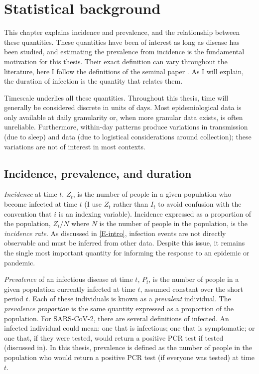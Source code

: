 \documentclass[thesis.tex]{subfiles}
\begin{document}
\chapter{Statistical background} \label{incidence-prevalence}

This chapter explains incidence and prevalence, and the relationship between these quantities.
These quantities have been of interest as long as disease has been studied, and estimating the prevalence from incidence is the fundamental motivation for this thesis.
Their exact definition can vary throughout the literature, here I follow the definitions of the seminal paper \textcite{freemanPrevalence}.
As I will explain, the duration of infection is the quantity that relates them.

Timescale underlies all these quantities.
Throughout this thesis, time will generally be considered discrete in units of days.
Most epidemiological data is only available at daily granularity or, when more granular data exists, is often unreliable.
Furthermore, within-day patterns produce variations in transmission (\eg due to sleep) and data (\eg due to logistical considerations around collection); these variations are not of interest in most contexts.

\section{Incidence, prevalence, and duration}

\emph{Incidence} at time $t$, $Z_t$, is the number of people in a given population who become infected at time $t$ (I use $Z_t$ rather than $I_t$ to avoid confusion with the convention that $i$ is an indexing variable).
Incidence expressed as a proportion of the population, $Z_t/N$ where $N$ is the number of people in the population, is the \emph{incidence rate}.
As discussed in \cref{E-intro}, infection events are not directly observable and must be inferred from other data.
Despite this issue, it remains the single most important quantity for informing the response to an epidemic or pandemic.

\emph{Prevalence} of an infectious disease at time $t$, $P_t$, is the number of people in a given population currently infected at time $t$, assumed constant over the short period $t$.
Each of these individuals is known as a \emph{prevalent} individual.
The \emph{prevalence proportion} is the same quantity expressed as a proportion of the population.
For SARS-CoV-2, there are several definitions of infected.
An infected individual could mean: one that is infectious; one that is symptomatic; or one that, if they were tested, would return a positive PCR test if tested (discussed in).
In this thesis, prevalence is defined as the number of people in the population who would return a positive PCR test (if everyone was tested) at time $t$.
\end{document}
